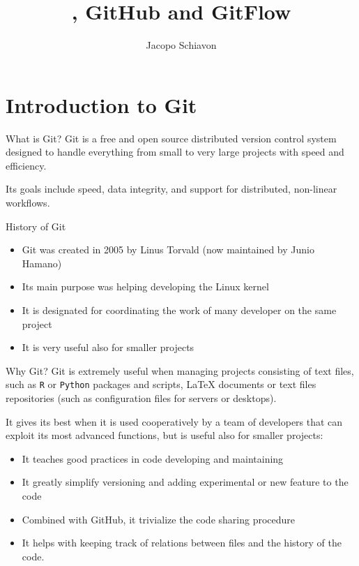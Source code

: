 \documentclass{beamer}
\title{\git, GitHub and GitFlow}
\author{Jacopo Schiavon}
\institute[Dep. Statistical Sciences --- UNIPD]{Department of Statistical Sciences\\ University of Padova}
\newcommand{\git}{Git{}}
\begin{document}
\begin{frame}[plain]
    \maketitle
\end{frame}

\begin{frame}{}
\tableofcontents
\end{frame}

\section{Introduction to \git}
\begin{frame}{What is \git?}
    \alert{\git} is a \alert{free} and \alert{open source} distributed \alert{version control system} designed to handle everything from small to very large projects with speed and efficiency. 
    
    Its goals include \alert{speed}, \alert{data integrity}, and support for \alert{distributed}, \alert{non-linear workflows}.
    
    \begin{block}{History of \git}
        \begin{itemize}
            \item \git{} was created in 2005 by Linus Torvald (now maintained by Junio Hamano)
            \item Its main purpose was helping developing the Linux kernel
            \item It is designated for coordinating the work of many developer on the same project
            \item It is very useful also for smaller projects
        \end{itemize}
    \end{block}
\end{frame}

\begin{frame}{Why \git?}
    \git{} is extremely useful when managing \alert{projects consisting of text files}, such as \texttt{R} or \texttt{Python} packages and scripts, \LaTeX{} documents or text files repositories (such as configuration files for servers or desktops).
    
    It gives its best when it is used cooperatively by a \alert{team of developers} that can exploit its most advanced functions, but is useful also for smaller projects:
    \begin{itemize}
        \item It teaches \alert{good practices} in code developing and maintaining
        \item It greatly simplify \alert{versioning} and adding experimental or new feature to the code
        \item Combined with GitHub, it trivialize the \alert{code sharing} procedure
        \item It helps with keeping track of relations between files and the \alert{history of the code}.
    \end{itemize}
\end{frame}
\end{document}
